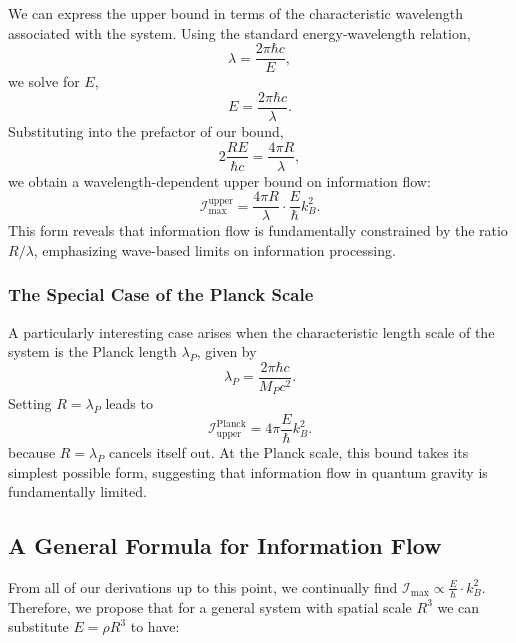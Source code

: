 \documentclass[12pt]{article}
\begin{document}
We can express the upper bound in terms of the characteristic wavelength associated with the system. Using the standard energy-wavelength relation,
\begin{equation}
    \lambda = \frac{2\pi \hbar c}{E},
\end{equation}
we solve for \( E \),
\begin{equation}
    E = \frac{2\pi \hbar c}{\lambda}.
\end{equation}
Substituting into the prefactor of our bound,
\begin{equation}
    2 \frac{R E}{\hbar c} = \frac{4\pi R}{\lambda},
\end{equation}
we obtain a wavelength-dependent upper bound on information flow:
\begin{equation}
    \mathcal{I}_{\text{max}}^{\text{upper}} = \frac{4\pi R}{\lambda} \cdot \frac{E}{\hbar} k_B^2.
\end{equation}
This form reveals that information flow is fundamentally constrained by the ratio \( R / \lambda \), emphasizing wave-based limits on information processing.

\subsubsection{The Special Case of the Planck Scale}

A particularly interesting case arises when the characteristic length scale of the system is the Planck length \( \lambda_P \), given by
\begin{equation}
    \lambda_P = \frac{2\pi \hbar c}{M_P c^2}.
\end{equation}
Setting \( R = \lambda_P \) leads to
\begin{equation}
    \mathcal{I}_{\text{upper}}^{\text{Planck}} = 4\pi \frac{E}{\hbar} k_B^2.
\end{equation}
because \( R = \lambda_P \) cancels itself out. At the Planck scale, this bound takes its simplest possible form, suggesting that information flow in quantum gravity is fundamentally limited.


\subsection{A General Formula for Information Flow}

From all of our derivations up to this point, we continually find \(\mathcal{I}_{\max} \propto \frac{E}{\hbar} \cdot k_B^2\). Therefore, we propose that for a general system with spatial scale $R^3$ we can substitute $E = \rho R^3$ to have:
\end{document}
